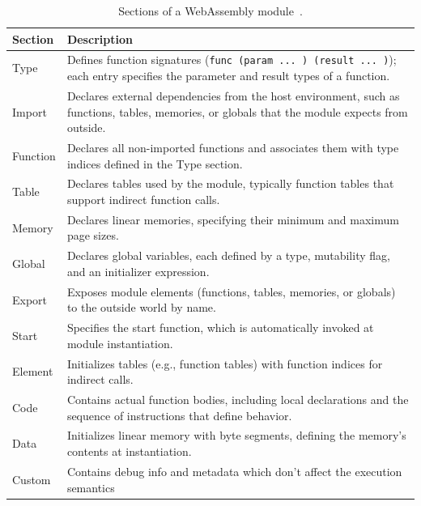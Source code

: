 \begin{table}[t]
    \footnotesize
    \caption{Sections of a WebAssembly module~\cite{spec}.}
    \begin{tabular}{l p{14.5cm}}
        \toprule
        \textbf{Section} & \textbf{Description} \\
        \midrule
        Type     & Defines function signatures (\texttt{func (param ... ) (result ... )}); each entry specifies the parameter and result types of a function. \\
        Import   & Declares external dependencies from the host environment, such as functions, tables, memories, or globals that the module expects from outside. \\
        Function & Declares all non-imported functions and associates them with type indices defined in the Type section. \\
        Table    & Declares tables used by the module, typically function tables that support indirect function calls. \\
        Memory   & Declares linear memories, specifying their minimum and maximum page sizes. \\
        Global   & Declares global variables, each defined by a type, mutability flag, and an initializer expression. \\
        Export   & Exposes module elements (functions, tables, memories, or globals) to the outside world by name. \\
        Start    & Specifies the start function, which is automatically invoked at module instantiation. \\
        Element  & Initializes tables (e.g., function tables) with function indices for indirect calls. \\
        \rowcolor{lightgray}Code     & Contains actual function bodies, including local declarations and the sequence of instructions that define behavior. \\
        Data     & Initializes linear memory with byte segments, defining the memory’s contents at instantiation. \\
        Custom   & Contains debug info and metadata which don't affect the execution semantics \\
        \bottomrule
    \end{tabular}
    \label{tab:wasm_sections}
\end{table}
